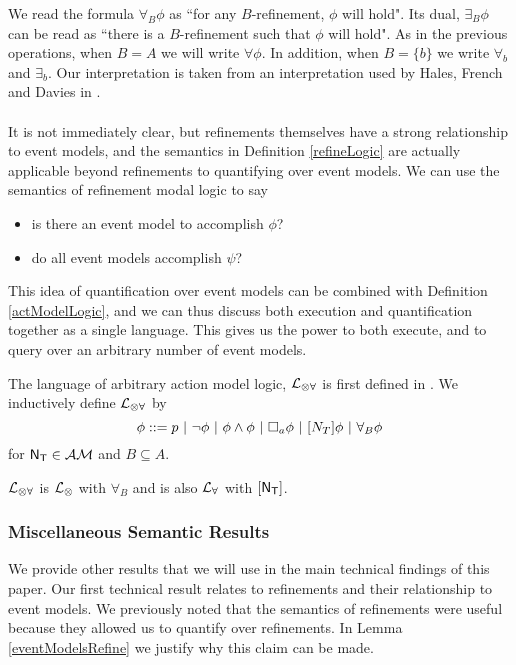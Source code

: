 We read the formula $\forall_B \phi$ as ``for any $B$-refinement, $\phi$ will hold".
Its dual, $\exists_B \phi$ can be read as ``there is a $B$-refinement such that $\phi$ will hold".
As in the previous operations, when $B = A$ we will write $\forall \phi$.
In addition, when $B = \{b\}$ we write $\forall_b$ and $\exists_b$.
Our interpretation is taken from an interpretation used by Hales, French and Davies in
\cite{hales2012refinement}.\\
\\
It is not immediately clear, but refinements themselves have a strong relationship to event models,
and the semantics in Definition \ref{refineLogic} are actually applicable beyond refinements to
quantifying over event models.
We can use the semantics of refinement modal logic to say

\begin{itemize}
	\item is there an event model to accomplish $\phi$?	
	\item do all event models accomplish $\psi$?
\end{itemize}

This idea of quantification over event models can be combined with Definition \ref{actModelLogic},
and we can thus discuss both execution and quantification together as a single language.
This gives us the power to both execute, and to query over an arbitrary number of event models.

\begin{defn} \label{arbActLogic}
The language of arbitrary action model logic, $\mathcal{L}_{\otimes\forall}$ is first defined in \cite{hales13synthesis}.
We inductively define $\mathcal{L}_{\otimes\forall}$ by
\[
	\phi ::= p \text{ } | \text{ } \neg \phi \text{ } | \text{ } \phi \land \phi \text{ } | \text{ } \Box_a \phi \text{ } |
  \text{ }[{N_T}] \phi \text{ } | \text{ } \forall_B \phi
\]
for $\mathrm{\mathsf{\mathrm{\mathsf{N}}_T}} \in \mathcal{AM}$ and $B \subseteq A$.
\end{defn}

$\mathcal{L}_{\otimes\forall}$ is $\mathcal{L}_{\otimes}$ with $\forall_B$ and is also $\mathcal{L}_{\forall}$ with $[{\mathrm{\mathsf{N}}_\mathrm{\mathsf{T}}}]$.

\subsubsection{Miscellaneous Semantic Results}
We provide other results that we will use in the main technical findings of this paper.
Our first technical result relates to refinements and their relationship to event models.
We previously noted that the semantics of refinements were useful because they allowed us to
quantify over refinements.
In Lemma \ref{eventModelsRefine} we justify why this claim can be made.

